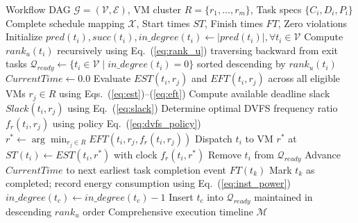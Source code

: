 \documentclass[default,sn-mathphys-num]{sn-jnl}
\theoremstyle{thmstyleone}
\theoremstyle{thmstyletwo}
\theoremstyle{thmstylethree}
\begin{document}
\begin{algorithm}[t]
\caption{Kahn-Rank Critical Path Workflow DAG Scheduler}\label{alg:dag_scheduler}
\begin{algorithmic}[1]
\Require Workflow DAG $\mathcal{G} = (\mathcal{V}, \mathcal{E})$, VM cluster $R = \{r_1, \dots, r_m\}$, Task specs $\{C_i, D_i, P_i\}$
\Ensure Complete schedule mapping $\mathcal{X}$, Start times $ST$, Finish times $FT$, Zero violations
\State Initialize $pred(t_i), succ(t_i), in\_degree(t_i) \gets |pred(t_i)|, \forall t_i \in \mathcal{V}$
\State Compute $rank_u(t_i)$ recursively using Eq.~(\ref{eq:rank_u}) traversing backward from exit tasks
\State $\mathcal{Q}_{ready} \gets \{t_i \in \mathcal{V} \mid in\_degree(t_i) = 0\}$ sorted descending by $rank_u(t_i)$
\State $CurrentTime \gets 0.0$
        \State Evaluate $EST(t_i, r_j)$ and $EFT(t_i, r_j)$ across all eligible VMs $r_j \in R$ using Eqs.~(\ref{eq:est})--(\ref{eq:eft})
        \State Compute available deadline slack $Slack(t_i, r_j)$ using Eq.~(\ref{eq:slack})
        \State Determine optimal DVFS frequency ratio $f_r(t_i, r_j)$ using policy Eq.~(\ref{eq:dvfs_policy})
        \State $r^* \gets \arg\min_{r_j \in R} EFT(t_i, r_j, f_r(t_i, r_j))$
        \State Dispatch $t_i$ to VM $r^*$ at $ST(t_i) \gets EST(t_i, r^*)$ with clock $f_r(t_i, r^*)$
        \State Remove $t_i$ from $\mathcal{Q}_{ready}$
    \EndFor
    \State Advance $CurrentTime$ to next earliest task completion event $FT(t_k)$
    \State Mark $t_k$ as completed; record energy consumption using Eq.~(\ref{eq:inst_power})
        \State $in\_degree(t_c) \gets in\_degree(t_c) - 1$
            \State Insert $t_c$ into $\mathcal{Q}_{ready}$ maintained in descending $rank_u$ order
        \EndIf
    \EndFor
\EndWhile
\State \Return Comprehensive execution timeline $\mathcal{M}$
\end{algorithmic}
\end{algorithm}
\end{document}

